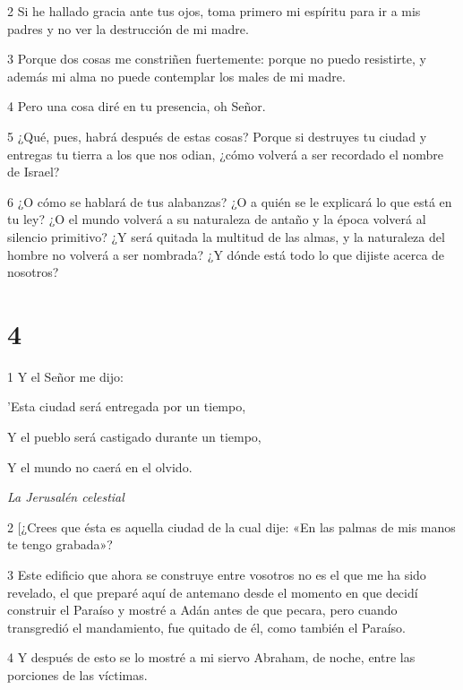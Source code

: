 \par 2 Si he hallado gracia ante tus ojos, toma primero mi espíritu para ir a mis padres y no ver la destrucción de mi madre.

\par 3 Porque dos cosas me constriñen fuertemente: porque no puedo resistirte, y además mi alma no puede contemplar los males de mi madre.

\par 4 Pero una cosa diré en tu presencia, oh Señor.

\par 5 ¿Qué, pues, habrá después de estas cosas? Porque si destruyes tu ciudad y entregas tu tierra a los que nos odian, ¿cómo volverá a ser recordado el nombre de Israel?

\par 6 ¿O cómo se hablará de tus alabanzas? ¿O a quién se le explicará lo que está en tu ley? ¿O el mundo volverá a su naturaleza de antaño y la época volverá al silencio primitivo? ¿Y será quitada la multitud de las almas, y la naturaleza del hombre no volverá a ser nombrada? ¿Y dónde está todo lo que dijiste acerca de nosotros?

\chapter{4}

\par 1 Y el Señor me dijo:

'Esta ciudad será entregada por un tiempo,

Y el pueblo será castigado durante un tiempo,

\par Y el mundo no caerá en el olvido.

\par \textit{La Jerusalén celestial}

\par 2 [¿Crees que ésta es aquella ciudad de la cual dije: «En las palmas de mis manos te tengo grabada»?

\par 3 Este edificio que ahora se construye entre vosotros no es el que me ha sido revelado, el que preparé aquí de antemano desde el momento en que decidí construir el Paraíso y mostré a Adán antes de que pecara, pero cuando transgredió el mandamiento, fue quitado de él, como también el Paraíso.

\par 4 Y después de esto se lo mostré a mi siervo Abraham, de noche, entre las porciones de las víctimas.

